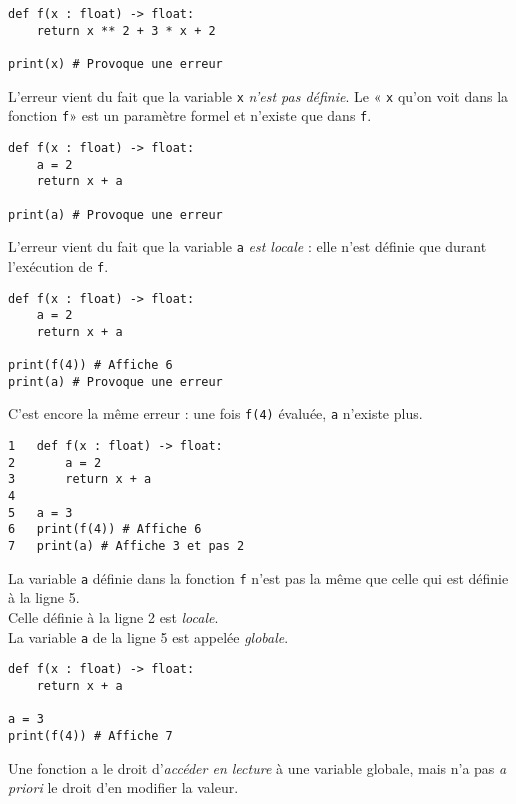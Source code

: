 \begin{pyc}
\begin{verbatim}
def f(x : float) -> float:
    return x ** 2 + 3 * x + 2
    
print(x) # Provoque une erreur
\end{verbatim}
\end{pyc}
L'erreur vient du fait que la variable \texttt{x} \textit{n'est pas définie}. Le « \texttt{x} qu'on voit dans la fonction \texttt{f}»  est un paramètre formel et n'existe que dans \texttt{f}.\\


\begin{pyc}
\begin{verbatim}
def f(x : float) -> float:
    a = 2
    return x + a

print(a) # Provoque une erreur
    \end{verbatim}
\end{pyc}
L'erreur vient du fait que la variable \texttt{a} \textit{est locale} : elle n'est définie que durant l'exécution de \texttt{f}.\\

\begin{pyc}
\begin{verbatim}
def f(x : float) -> float:
    a = 2
    return x + a

print(f(4)) # Affiche 6        
print(a) # Provoque une erreur
    \end{verbatim}
\end{pyc}
C'est encore la même erreur : une fois \texttt{f(4)} évaluée, \texttt{a} n'existe plus.\\

\begin{pyc}
\begin{verbatim}
1   def f(x : float) -> float:
2       a = 2
3       return x + a
4
5   a = 3
6   print(f(4)) # Affiche 6
7   print(a) # Affiche 3 et pas 2
\end{verbatim}
\end{pyc}

La variable \texttt{a} définie dans la fonction \texttt{f} n'est pas la même que celle qui est définie à la ligne 5.\\
Celle définie à la ligne 2 est \textit{locale}.\\
La variable \texttt{a} de la ligne 5 est appelée \textit{globale}.\\



\begin{pyc}
\begin{verbatim}
def f(x : float) -> float:
    return x + a
        
a = 3
print(f(4)) # Affiche 7
\end{verbatim}
\end{pyc}
\begin{aretenir}
Une fonction a le droit d'\textit{accéder en lecture} à une variable globale, mais n'a pas \textit{a priori} le droit d'en modifier la valeur.
\end{aretenir}

